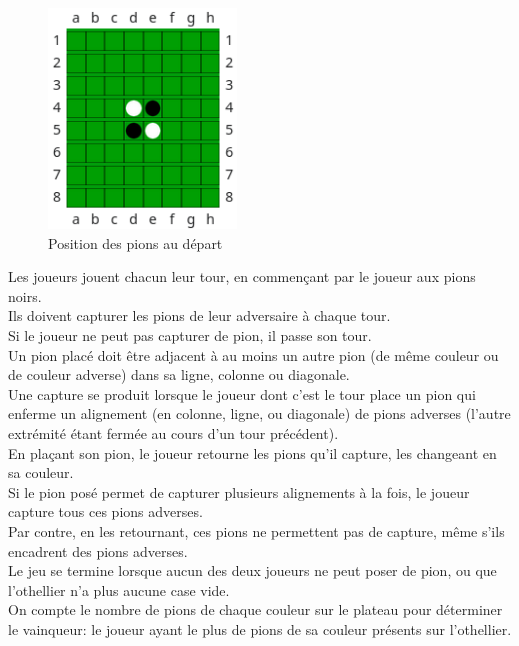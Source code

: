 \documentclass[a4paper,12pt]{article}
\begin{document}
\begin{figure}[!h]
  \centering
  \includegraphics[width=5cm]{images/ReversiStartingPos.png}
  \caption{Position des pions au départ}
\end{figure}

Les joueurs jouent chacun leur tour, en commençant par le joueur aux pions
noirs.\\ Ils doivent capturer les pions de leur adversaire à chaque tour.\\ Si
le joueur ne peut pas capturer de pion, il passe son tour.\\ Un pion placé doit
être adjacent à au moins un autre pion (de même couleur ou de couleur adverse)
dans sa ligne, colonne ou diagonale.\\

Une capture se produit lorsque le joueur dont c'est le tour place un pion qui
enferme un alignement (en colonne, ligne, ou diagonale) de pions adverses
(l'autre extrémité étant fermée au cours d'un tour précédent).\\ En plaçant son
pion, le joueur retourne les pions qu'il capture, les changeant en sa
couleur.\\ Si le pion posé permet de capturer plusieurs alignements à la fois,
le joueur capture tous ces pions adverses.\\ Par contre, en les retournant, ces
pions ne permettent pas de capture, même s'ils encadrent des pions adverses.\\

Le jeu se termine lorsque aucun des deux joueurs ne peut poser de pion, ou que
l'othellier n'a plus aucune case vide.\\ On compte le nombre de pions de chaque
couleur sur le plateau pour déterminer le vainqueur: le joueur ayant le plus de
pions de sa couleur présents sur l'othellier.\\
\end{document}
